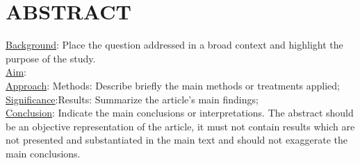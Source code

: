 
\noindent\section{ABSTRACT}
\uline{Background}: Place the question addressed in a broad context and highlight the purpose of the study.\\

\noindent\uline{Aim}: \\

\noindent\uline{Approach}: Methods: Describe briefly the main methods or treatments applied;\\

\noindent\uline{Significance}:Results: Summarize the article’s main findings;\\ 

\noindent\uline{Conclusion}: Indicate the main conclusions or interpretations. The abstract should be an objective representation of the article, it must not contain results which are not presented and substantiated in the main text and should not exaggerate the main conclusions.

